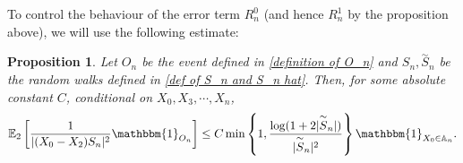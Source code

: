 \documentclass[9pt,a4paper,reqno]{amsart}
\newcommand{\tildea}[1]{\overset{\sim}{#1}}
\theoremstyle{mine}
\newtheorem{prop}[thm]{Proposition}
\theoremstyle{definition}
\theoremstyle{remark}
\newcommand{\mb}{\mathbb}
\begin{document}
To control the behaviour of the error term $R_n^0$ (and hence $R_n^1$ by the proposition above), we will use the following estimate:

\begin{prop}\label{key proposition for soft error term}
Let $O_n$ be the event defined in \eqref{definition of O_n} and $S_n, \tildea{S}_n$ be the random walks defined in \eqref{def of S_n and S_n hat}. Then, for some absolute constant $C$, conditional on $X_0,X_3, \cdots, X_n$, 
    \begin{align}\label{Inverse-RW-estimate}
        \mathbb{E}_2\left[\frac{1}{|(X_0-X_2)S_n|^2} \mathbbm{1}_{O_n} 
     \right] \leq C \min \left \{ 1, \frac{\log(1+2|\tildea{S}_n|)}{|\tildea{S}_n|^2}  \right \}\mathbbm{1}_{X_0 \in \mb{A}_n}.
    \end{align}
\end{prop}
\end{document}
